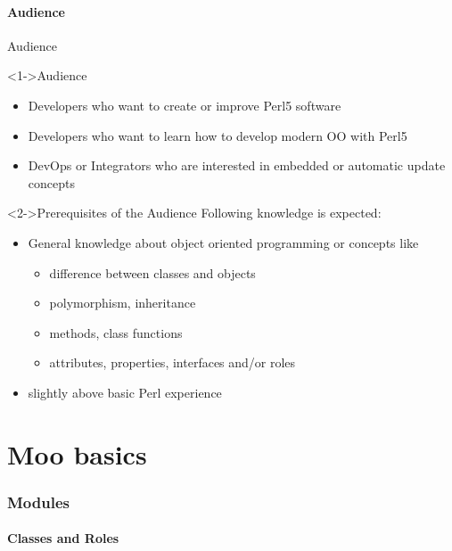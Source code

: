 \documentclass[ngerman,xcolor={table,dvipsnames},smaller,compress,hyperref={bookmarks,colorlinks}]{beamer}%
\begin{document}
\subsection{Audience}

\begin{frame}[t,fragile]{Audience}
\begin{block}<1->{Audience}
\begin{itemize}
\item Developers who want to create or improve Perl5 software
\item Developers who want to learn how to develop modern OO with Perl5
\item DevOps or Integrators who are interested in embedded or automatic update concepts
\end{itemize}
\end{block}

\begin{block}<2->{Prerequisites of the Audience}
Following knowledge is expected:
\begin{itemize}
\item General knowledge about object oriented programming or concepts like
    \small
    \begin{itemize}
    \item difference between classes and objects
    \item polymorphism, inheritance
    \item methods, class functions
    \item attributes, properties, interfaces and/or roles
    \end{itemize}
    \normalsize
\item slightly above basic Perl experience
\end{itemize}
\end{block}
\end{frame}

\part{Moo basics}

\section{Modules}

\subsection{Classes and Roles}
\end{document}
